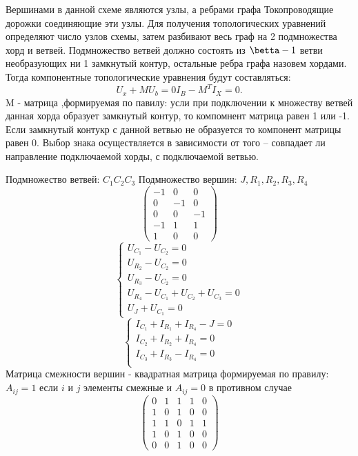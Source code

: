 \documentclass{article}
\begin{document}
Вершинами в данной схеме являются узлы, а ребрами графа Токопроводящие дорожки соединяющие эти узлы. Для получения топологических уравнений определяют число узлов схемы, затем разбивают весь граф
на 2 подмножества хорд и ветвей. Подмножество ветвей должно состоять из $\betta - 1$ ветви необразующих ни 1 замкнутый контур, остальные ребра графа назовем хордами. Тогда компонентные топологические уравнения будут составляться:
\[
U_x + M U_b = 0
I_B - M^T I_X = 0
.\]
M - матрица ,формируемая по павилу: усли при подключении к множеству ветвей данная хорда образует замкнутый контур, то компомнент матрица равен 1 или -1. Если замкнутый контукр с данной ветвью не образуется то компонент матрицы равен 0. Выбор знака осуществляется в зависимости от того -- совпадает ли направление подключаемой хорды, с подключаемой ветвью.

Подмножество ветвей: $C_1 C_2 C_3$
Подмножество вершин: $J, R_1, R_2, R_3, R_4$
$$\begin{pmatrix}
	-1 & 0 & 0\\
	0 & -1 & 0\\
	0 & 0 & -1\\
	-1 & 1 & 1\\
	1 & 0 & 0
\end{pmatrix}$$
$$
\begin{equation}
	\begin{cases}
		U_{C_1} - U_{C_2} = 0\\
		U_{R_2} - U_{C_2} = 0\\
		U_{R_3} - U_{C_2} = 0\\
		U_{R_4} - U_{C_1} + U_{C_2} + U_{C_3} = 0\\
		U_J + U_{C_1} = 0
	\end{cases}
\end{equation}$$
$$
\begin{equation}
	\begin {cases}
		I_{C_1} + I_{R_1} + I_{R_4} - J = 0\\
		I_{C_2} + I_{R_2} + I_{R_4} = 0\\
		I_{C_3} + I_{R_3} - I_{R_4} = 0\\
	\end{cases}
\end{equation}
$$
Матрица смежности вершин - квадратная матрица формируемая по правилу: $A_{ij} = 1$ если $i$ и $j$ элементы смежные и $A_{ij} = 0$ в противном случае
$$
\begin{pmatrix}
	0 & 1 & 1 & 1 & 0\\
	1 & 0 & 1 & 0 & 0\\
	1 & 1 & 0 & 1 & 1\\
	1 & 0 & 1 & 0 & 0\\
	0 & 0 & 1 & 0 & 0
\end{pmatrix}
$$
\end{document}
